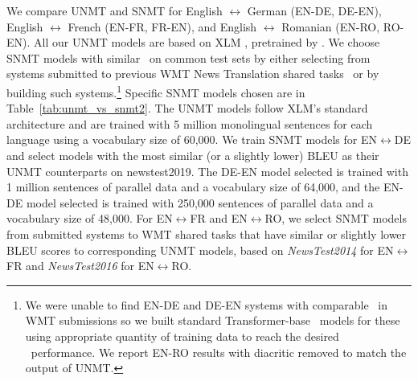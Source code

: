 We compare UNMT and SNMT for English $\leftrightarrow$ German (EN-DE, DE-EN), English $\leftrightarrow$ French (EN-FR, FR-EN), and English $\leftrightarrow$ Romanian (EN-RO, RO-EN).
All our UNMT models are based on XLM \citep{conneau-NIPS2019-xlm}, pretrained by \citet{XLM-UNMT-Models20}. 
We choose SNMT models with similar \bleu\ on common test sets by either selecting from systems submitted to previous WMT News Translation shared tasks~\cite{bojar-etal-2014-findings,bojar-etal-2016-findings} or by building such systems.\footnote{We were unable to find EN-DE and DE-EN systems with comparable \bleu\ in WMT submissions so we built standard Transformer-base~\cite{vaswani-2017-attention} models for these using appropriate quantity of training data to reach the desired \bleu\ performance. We report EN-RO results with diacritic removed to match the output of UNMT.} Specific SNMT models chosen are in Table~\ref{tab:unmt_vs_snmt2}. 
The UNMT models follow XLM's standard architecture and are trained with 5 million monolingual sentences for each language using a vocabulary size of 60,000. 
We train SNMT models for EN$\leftrightarrow$DE and select models with the most similar (or a slightly lower) BLEU as their UNMT counterparts on newstest2019. The DE-EN model selected is trained with 1 million sentences of parallel data and a vocabulary size of 64,000, and the EN-DE model selected is trained with 250,000 sentences of parallel data and a vocabulary size of 48,000. For EN$\leftrightarrow$FR and EN$\leftrightarrow$RO, we select SNMT models from submitted systems to WMT shared tasks that have similar or slightly lower BLEU scores to corresponding UNMT models, based on \textit{NewsTest2014} for EN$\leftrightarrow$FR and \textit{NewsTest2016} for EN$\leftrightarrow$RO. 

